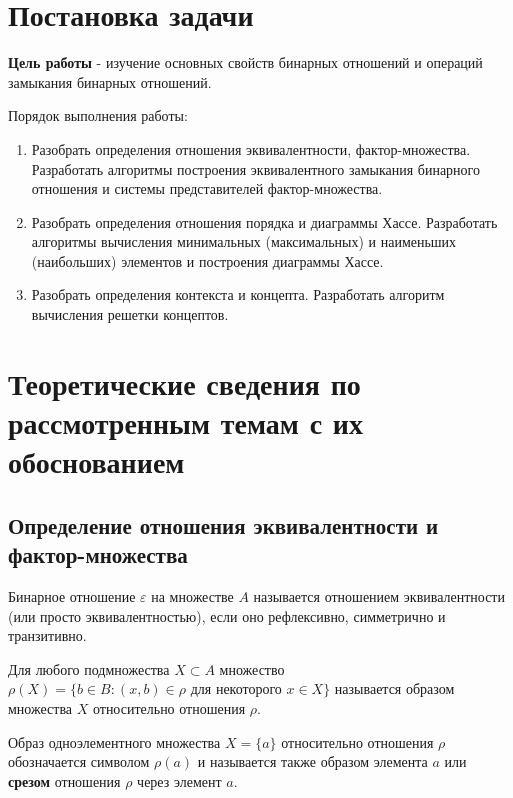 \documentclass[bachelor, och, labwork]{shiza}
\begin{document}

\section{Постановка задачи}

    \textbf{Цель работы} - изучение основных свойств бинарных отношений и операций замыкания бинарных отношений. 

    Порядок выполнения работы:
    \begin{enumerate}
        \item Разобрать определения отношения эквивалентности, фактор-множества. Разработать алгоритмы построения
        эквивалентного замыкания бинарного отношения и системы представителей фактор-множества.
        \item Разобрать определения отношения порядка и диаграммы Хассе. Разработать алгоритмы вычисления минимальных
        (максимальных) и наименьших (наибольших) элементов  и построения диаграммы Хассе.
        \item Разобрать определения контекста и концепта. Разработать алгоритм вычисления решетки концептов.
    \end{enumerate}

\section{Теоретические сведения по рассмотренным темам с их обоснованием}

    \subsection{Определение отношения эквивалентности и фактор-множества}

        Бинарное отношение $\varepsilon$ на множестве $A$ называется отношением эквивалентности (или просто эквивалентностью), если оно рефлексивно, симметрично и транзитивно.

        Для любого подмножества $X \subset A$ множество $\rho(X) = \{b \in B: (x, b) \in \rho \text{ для некоторого } x \in X\}$ называется образом множества $X$ относительно отношения $\rho$.

        Образ одноэлементного множества $X = \{a\}$ относительно отношения $\rho$ обозначается символом $\rho(a)$ и называется также образом элемента $a$ или \textbf{срезом} отношения $\rho$ через элемент $a$. 
\end{document}
